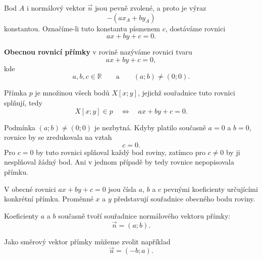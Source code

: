 Bod $A$ i normálový vektor $\vec{n}$ jsou pevně zvolené, a proto je
výraz
\[
    -(ax_A+by_A)
\]
konstantou. Označíme-li tuto konstantu písmenem $c$, dostáváme rovnici
\[
    ax+by+c=0.
\]

\begin{definition}\label{def:General_line_equation}
    \textbf{Obecnou rovnicí přímky} v rovině nazýváme rovnici tvaru
    \begin{equation}\label{eq:General_line_equation}
        ax+by+c=0,
    \end{equation}
    kde
    \[
        a,b,c\in\mathbb{R}
        \qquad\text{a}\qquad
        (a;b)\neq(0;0).
    \]

    Přímka $p$ je množinou všech bodů $X[x;y]$, jejichž souřadnice
    tuto rovnici splňují, tedy
    \[
        X[x;y]\in p
        \quad\Longleftrightarrow\quad
        ax+by+c=0.
    \]
\end{definition}

Podmínka $(a;b)\neq(0;0)$ je nezbytná. Kdyby platilo současně
$a=0$ a $b=0$, rovnice by se zredukovala na vztah
\[
    c=0.
\]
Pro $c=0$ by tuto rovnici splňoval každý bod roviny, zatímco pro
$c\neq0$ by ji nesplňoval žádný bod. Ani v jednom případě by tedy
rovnice nepopisovala přímku.

\begin{remark}\label{rem:Meaning_coefficients_general_line}
    V obecné rovnici $ax + by + c = 0$ jsou čísla $a$, $b$ a $c$ pevnými koeficienty určujícími konkrétní
    přímku. Proměnné $x$ a $y$ představují souřadnice obecného bodu
    roviny.

    Koeficienty $a$ a $b$ současně tvoří souřadnice normálového vektoru
    přímky:
    \begin{equation}\label{eq:Normal_vector_from_general_line}
        \vec{n}=(a;b).
    \end{equation}

    Jako směrový vektor přímky můžeme zvolit například
    \begin{equation}\label{eq:Direction_vector_from_general_line}
        \vec{u}=(-b;a).
    \end{equation}
\end{remark}

